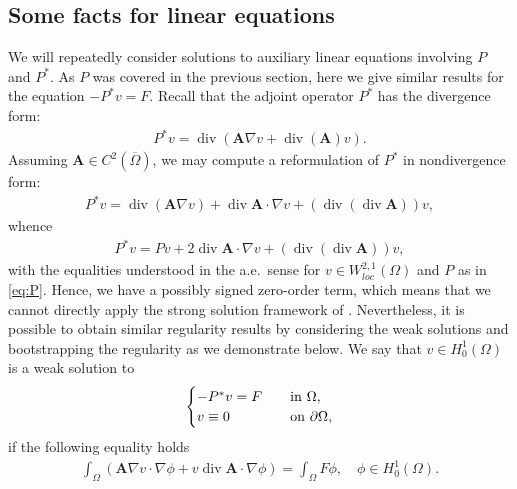 \documentclass[12pt,a4paper]{amsart}
\theoremstyle{definition}
\newcommand{\A}{\mathbf{A}}
\newcommand*\Div{\operatorname{div}}
\begin{document}
\subsection{Some facts for linear equations}
We will repeatedly consider solutions to auxiliary linear equations involving $P$ and $P^*$. As $P$ was covered in the previous section, here we give similar results for the equation $-P^* v = F$. Recall that the adjoint operator $P^*$ has the divergence form:
\begin{align*}
    P^*v = \Div(\A \nabla v + \Div (\A) v).
\end{align*}
Assuming $\A\in C^2(\overline{\Omega})$, we may compute a reformulation of $P^*$ in nondivergence form:
\begin{align*}
        P^*v = \Div(\A \nabla v) + \Div \A \cdot \nabla v + (\Div(\Div \A))v,
\end{align*}
 whence  
\begin{align} \label{eq:P*non-div-P}
    P^*v = Pv + 2\Div \A \cdot \nabla v + (\Div(\Div \A))v,
\end{align}
with the equalities understood in the a.e.~sense for $v\in W^{2,1}_{loc}(\Omega)$ and $P$ as in \eqref{eq:P}.
Hence, we have a possibly signed zero-order term, which means that we cannot directly apply the strong solution framework of \cite[Chapter~9]{MR1814364}. Nevertheless, it is possible to obtain similar regularity results by considering the weak solutions and bootstrapping the regularity as we demonstrate below. We say that $v\in H^1_0(\Omega)$ is a weak solution to
\begin{align}\label{eq:Pstarv}
\begin{cases}
    -P^*v = F\quad &{\rm in}\ \Omega,\\
    v\equiv 0\quad &{\rm on}\ \partial\Omega,
\end{cases}
\end{align}
if the following equality holds
\begin{align*}
    \int_\Omega (\A \nabla v \cdot \nabla \phi + v\Div \A  \cdot \nabla \phi) = \int_\Omega F\phi,\quad \phi\in H^1_0(\Omega).
\end{align*}
\end{document}
